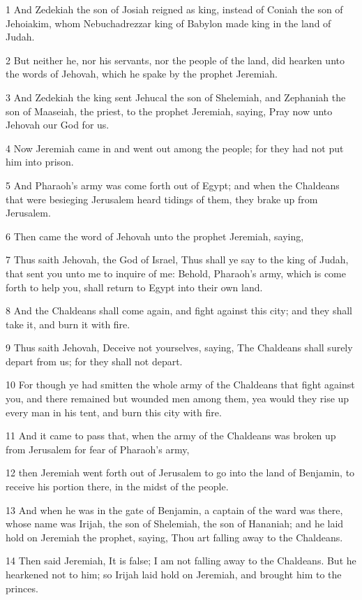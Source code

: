 \par 1 And Zedekiah the son of Josiah reigned as king, instead of Coniah the son of Jehoiakim, whom Nebuchadrezzar king of Babylon made king in the land of Judah.
\par 2 But neither he, nor his servants, nor the people of the land, did hearken unto the words of Jehovah, which he spake by the prophet Jeremiah.
\par 3 And Zedekiah the king sent Jehucal the son of Shelemiah, and Zephaniah the son of Maaseiah, the priest, to the prophet Jeremiah, saying, Pray now unto Jehovah our God for us.
\par 4 Now Jeremiah came in and went out among the people; for they had not put him into prison.
\par 5 And Pharaoh's army was come forth out of Egypt; and when the Chaldeans that were besieging Jerusalem heard tidings of them, they brake up from Jerusalem.
\par 6 Then came the word of Jehovah unto the prophet Jeremiah, saying,
\par 7 Thus saith Jehovah, the God of Israel, Thus shall ye say to the king of Judah, that sent you unto me to inquire of me: Behold, Pharaoh's army, which is come forth to help you, shall return to Egypt into their own land.
\par 8 And the Chaldeans shall come again, and fight against this city; and they shall take it, and burn it with fire.
\par 9 Thus saith Jehovah, Deceive not yourselves, saying, The Chaldeans shall surely depart from us; for they shall not depart.
\par 10 For though ye had smitten the whole army of the Chaldeans that fight against you, and there remained but wounded men among them, yea would they rise up every man in his tent, and burn this city with fire.
\par 11 And it came to pass that, when the army of the Chaldeans was broken up from Jerusalem for fear of Pharaoh's army,
\par 12 then Jeremiah went forth out of Jerusalem to go into the land of Benjamin, to receive his portion there, in the midst of the people.
\par 13 And when he was in the gate of Benjamin, a captain of the ward was there, whose name was Irijah, the son of Shelemiah, the son of Hananiah; and he laid hold on Jeremiah the prophet, saying, Thou art falling away to the Chaldeans.
\par 14 Then said Jeremiah, It is false; I am not falling away to the Chaldeans. But he hearkened not to him; so Irijah laid hold on Jeremiah, and brought him to the princes.
